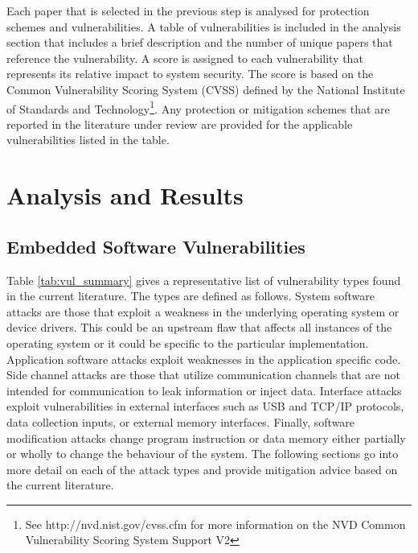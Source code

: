 \documentclass[final,conference,11pt]{IEEEtran}
\begin{document}
Each paper that is selected in the previous step is analysed for protection schemes and vulnerabilities.  A table of vulnerabilities is included in the analysis section that includes a brief description and the number of unique papers that reference the vulnerability. A score is assigned to each vulnerability that represents its relative impact to system security. The score is based on the Common Vulnerability Scoring System (CVSS) defined by the National Institute of Standards and Technology\footnote{See http://nvd.nist.gov/cvss.cfm for more information on the NVD Common Vulnerability Scoring System Support V2}.  Any protection or mitigation schemes that are reported in the literature under review are provided for the applicable vulnerabilities listed in the table.  

\section{Analysis and Results}

\subsection{Embedded Software Vulnerabilities}

Table \ref{tab:vul_summary} gives a representative list of vulnerability types found in the current literature.  The types are defined as follows.  System software attacks are those that exploit a weakness in the underlying operating system or device drivers.  This could be an upstream flaw that affects all instances of the operating system or it could be specific to the particular implementation. Application software attacks exploit weaknesses in the application specific code.  Side channel attacks are those that utilize communication channels that are not intended for communication to leak information or inject data.  Interface attacks exploit vulnerabilities in external interfaces such as USB and TCP/IP protocols, data collection inputs, or external memory interfaces.  Finally, software modification attacks change program instruction or data memory either partially or wholly to change the behaviour of the system.  The following sections go into more detail on each of the attack types and provide mitigation advice based on the current literature.
\end{document}
